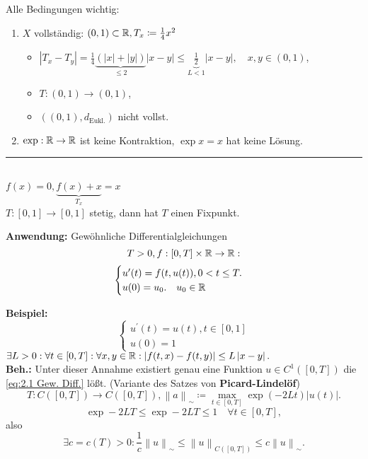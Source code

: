 \begin{subexample}
	Alle Bedingungen wichtig:
	\begin{enumerate}[label=(\roman*)]
		\item $ X $ vollständig: $ (0, 1) \subset \mathbb{R} , T_x \coloneqq \frac{ 1 }{ 4 } x^2 $ 
			\begin{itemize}
				\item $ \left| T_x - T_y \right| = \frac{ 1 }{ 4 } \underbrace{\left( \left| x \right| + \left| y \right|  \right) }_{\leq 2} \left| x - y \right| \leq \underbrace{\frac{ 1 }{ 2 } }_{L < 1} \left| x - y \right| , \quad x, y \in (0, 1) $,
				\item $ T: (0,1) \to (0, 1) $,
				\item $ \left( (0, 1), d_{\text{Eukl.} }  \right)  $ nicht vollst.
			\end{itemize}
		\item $ \exp : \mathbb{R} \to \mathbb{R}  $ ist keine Kontraktion, $ \exp x = x $ hat keine Lösung.
	\end{enumerate}
\end{subexample}

\rule{2cm}{0.4pt}\\
$ f(x) = 0, \underbrace{f(x) + x }_{T_x} = x $ \\
$ T : [0, 1] \to [0, 1] $ stetig, dann hat $ T $ einen Fixpunkt.

\textbf{Anwendung:} Gewöhnliche Differentialgleichungen
\[
	T > 0, f : [0, T] \times \mathbb{R} \to \mathbb{R} :
\]
\begin{equation}
	\label{eq:2.1 Gew. Diff.}
	\begin{cases}
		u^\prime (t) = f(t, u(t)), 0 < t \leq T.\\
		u(0) = u_0. \quad u_0 \in \mathbb{R} 
	\end{cases}
\end{equation}

\textbf{Beispiel:}
\[
	\begin{cases}
		u^\prime (t) = u(t), t \in [0, 1]\\
		u(0) = 1
	\end{cases}
\]
 $ \exists L > 0 : \forall  t \in [0, T] : \forall x, y \in \mathbb{R} : \left| f(t, x) - f(t, y) \right| \leq L \left| x - y \right| . $\\
\textbf{Beh.:} Unter dieser Annahme existiert genau eine Funktion $ u \in C^1 ([0, T]) $ die \ref{eq:2.1 Gew. Diff.} lößt. (Variante des Satzes von \textbf{Picard-Lindelöf})
\[
	T: C([0, T]) \to C([0, T]), \left\| a \right\| _{\sim} \coloneqq \max_{t \in [0, T]} \exp (-2 L t) \left| u(t) \right| .
\]
\[
	\exp -2LT \leq \exp -2LT \leq 1 \quad \forall t \in [0, T],
\]
also 
\begin{equation}
	\label{eq:2.1 2}
	\exists c = c(T) > 0 : \frac{ 1 }{ c } \left\| u \right\| _{\sim} \leq  \left\| u \right\| _{C([0, T])} \leq c \left\| u \right\| _{\sim} .
\end{equation}

